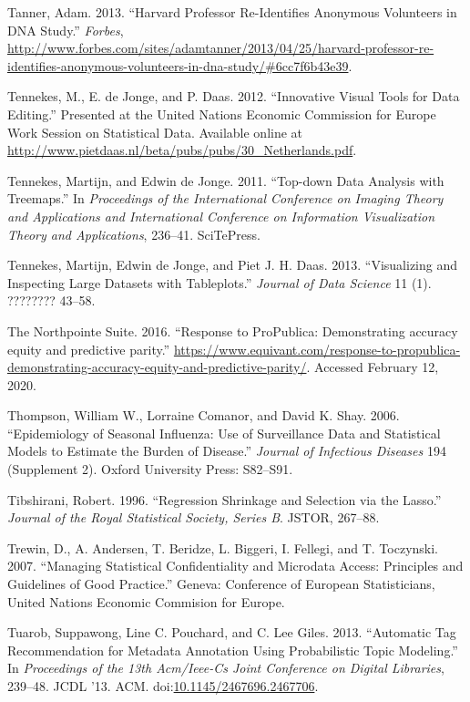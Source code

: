 \documentclass[]{krantz}
\begin{document}
\hypertarget{ref-forbesharvard}{}
Tanner, Adam. 2013. ``Harvard Professor Re-Identifies Anonymous
Volunteers in DNA Study.'' \emph{Forbes},
\url{http://www.forbes.com/sites/adamtanner/2013/04/25/harvard-professor-re-identifies-anonymous-volunteers-in-dna-study/\#6cc7f6b43e39}.

\hypertarget{ref-Tennekes2012}{}
Tennekes, M., E. de Jonge, and P. Daas. 2012. ``Innovative Visual Tools
for Data Editing.'' Presented at the United Nations Economic Commission
for Europe Work Session on Statistical Data. Available online at
\url{http://www.pietdaas.nl/beta/pubs/pubs/30_Netherlands.pdf}.

\hypertarget{ref-tennekes2011top}{}
Tennekes, Martijn, and Edwin de Jonge. 2011. ``Top-down Data Analysis
with Treemaps.'' In \emph{Proceedings of the International Conference on
Imaging Theory and Applications and International Conference on
Information Visualization Theory and Applications}, 236--41. SciTePress.

\hypertarget{ref-tennekes2013visualizing}{}
Tennekes, Martijn, Edwin de Jonge, and Piet J. H. Daas. 2013.
``Visualizing and Inspecting Large Datasets with Tableplots.''
\emph{Journal of Data Science} 11 (1). ???????? 43--58.

\hypertarget{ref-northpointe2016}{}
The Northpointe Suite. 2016. ``Response to ProPublica: Demonstrating
accuracy equity and predictive parity.''
\url{https://www.equivant.com/response-to-propublica-demonstrating-accuracy-equity-and-predictive-parity/}.
Accessed February 12, 2020.

\hypertarget{ref-thompson2006epidemiology}{}
Thompson, William W., Lorraine Comanor, and David K. Shay. 2006.
``Epidemiology of Seasonal Influenza: Use of Surveillance Data and
Statistical Models to Estimate the Burden of Disease.'' \emph{Journal of
Infectious Diseases} 194 (Supplement 2). Oxford University Press:
S82--S91.

\hypertarget{ref-tibshirani1996regression}{}
Tibshirani, Robert. 1996. ``Regression Shrinkage and Selection via the
Lasso.'' \emph{Journal of the Royal Statistical Society, Series B}.
JSTOR, 267--88.

\hypertarget{ref-trewin2007managing}{}
Trewin, D., A. Andersen, T. Beridze, L. Biggeri, I. Fellegi, and T.
Toczynski. 2007. ``Managing Statistical Confidentiality and Microdata
Access: Principles and Guidelines of Good Practice.'' Geneva: Conference
of European Statisticians, United Nations Economic Commision for Europe.

\hypertarget{ref-tuarob-13}{}
Tuarob, Suppawong, Line C. Pouchard, and C. Lee Giles. 2013. ``Automatic
Tag Recommendation for Metadata Annotation Using Probabilistic Topic
Modeling.'' In \emph{Proceedings of the 13th Acm/Ieee-Cs Joint
Conference on Digital Libraries}, 239--48. JCDL '13. ACM.
doi:\href{https://doi.org/10.1145/2467696.2467706}{10.1145/2467696.2467706}.
\end{document}
